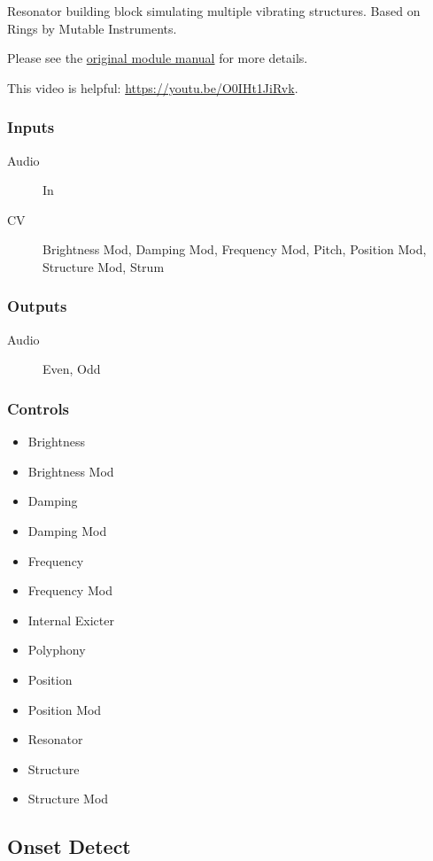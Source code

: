 Resonator building block simulating multiple vibrating structures. Based on Rings by Mutable Instruments.

Please see the \href{https://www.mutable-instruments.net/modules/rings/manual/}{original module manual} for more details.

This video is helpful: \url{https://youtu.be/O0IHt1JiRvk}.

\subsubsection{Inputs}
\begin{description}
\item [Audio] In
\item [CV] Brightness Mod, Damping Mod, Frequency Mod, Pitch, Position Mod, Structure Mod, Strum
\end{description}

\subsubsection{Outputs}
\begin{description}
\item [Audio] Even, Odd
\end{description}

\subsubsection{Controls}
\begin{itemize}
\item Brightness
\item Brightness Mod
\item Damping
\item Damping Mod
\item Frequency
\item Frequency Mod
\item Internal Exicter
\item Polyphony
\item Position
\item Position Mod
\item Resonator
\item Structure
\item Structure Mod
\end{itemize}

\subsection{Onset Detect}

